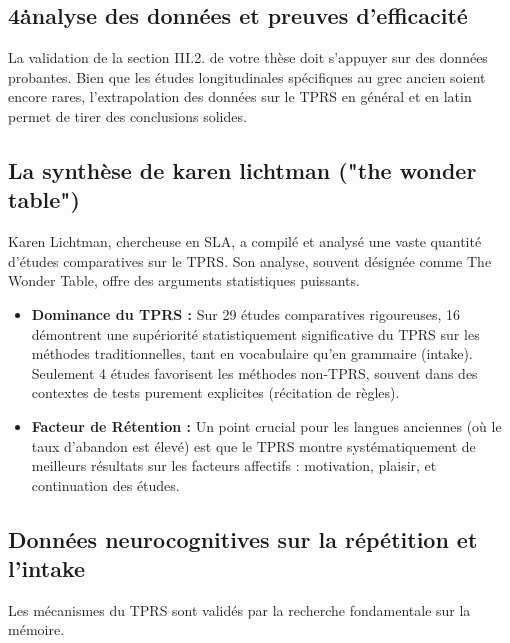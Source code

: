 \subsection{4\. analyse des données et preuves d'efficacité}

La validation de la section III.2.\cite{III-2-3-ref3} de votre thèse doit s'appuyer sur des données
probantes. Bien que les études longitudinales spécifiques au grec ancien soient encore rares,
l'extrapolation des données sur le TPRS en général et en latin permet de tirer des conclusions
solides.



\subsection{La synthèse de karen lichtman ("the wonder table")}

Karen Lichtman, chercheuse en SLA, a compilé et analysé une vaste quantité d'études comparatives sur
le TPRS. Son analyse, souvent désignée comme \og The Wonder Table\fg{}, offre des arguments
statistiques puissants.\cite{III-2-3-ref31}

\begin{itemize}\item \textbf{Dominance du TPRS :} Sur 29 études comparatives rigoureuses, 16 démontrent une supériorité statistiquement significative du TPRS sur les méthodes traditionnelles, tant en vocabulaire qu'en grammaire (intake). Seulement 4 études favorisent les méthodes non-TPRS, souvent dans des contextes de tests purement explicites (récitation de règles).\item \textbf{Facteur de Rétention :} Un point crucial pour les langues anciennes (où le taux d'abandon est élevé) est que le TPRS montre systématiquement de meilleurs résultats sur les facteurs affectifs : motivation, plaisir, et continuation des études.\cite{III-2-3-ref32}\end{itemize}

\subsection{Données neurocognitives sur la répétition et l'intake}

Les mécanismes du TPRS sont validés par la recherche fondamentale sur la mémoire.

